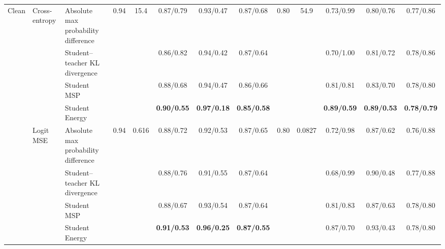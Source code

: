 \documentclass[border=2pt]{standalone}
\begin{document}
\begin{tabular}{lllcccccccccc}
\midrule
Clean & Cross-entropy & Absolute max probability difference & 0.94 & 15.4 & 0.87/0.79 & 0.93/0.47 & 0.87/0.68 & 0.80 & 54.9 & 0.73/0.99 & 0.80/0.76 & 0.77/0.86 \\
 &  & Student--teacher KL divergence &  &  & 0.86/0.82 & 0.94/0.42 & 0.87/0.64 &  &  & 0.70/1.00 & 0.81/0.72 & 0.78/0.86 \\
 &  & Student MSP &  &  & 0.88/0.68 & 0.94/0.47 & 0.86/0.66 &  &  & 0.81/0.81 & 0.83/0.70 & 0.78/0.80 \\
 &  & Student Energy &  &  & \textbf{0.90/0.55} & \textbf{0.97/0.18} & \textbf{0.85/0.58} &  &  & \textbf{0.89/0.59} & \textbf{0.89/0.53} & \textbf{0.78/0.79} \\
\addlinespace
 & Logit MSE & Absolute max probability difference & 0.94 & 0.616 & 0.88/0.72 & 0.92/0.53 & 0.87/0.65 & 0.80 & 0.0827 & 0.72/0.98 & 0.87/0.62 & 0.76/0.88 \\
 &  & Student--teacher KL divergence &  &  & 0.88/0.76 & 0.91/0.55 & 0.87/0.64 &  &  & 0.68/0.99 & 0.90/0.48 & 0.77/0.88 \\
 &  & Student MSP &  &  & 0.88/0.67 & 0.93/0.54 & 0.87/0.64 &  &  & 0.81/0.83 & 0.87/0.63 & 0.78/0.80 \\
 &  & Student Energy &  &  & \textbf{0.91/0.53} & \textbf{0.96/0.25} & \textbf{0.87/0.55} &  &  & 0.87/0.70 & 0.93/0.43 & 0.78/0.80 \\
\bottomrule
\end{tabular}
\end{document}
